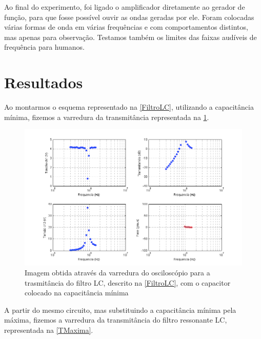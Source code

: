 \documentclass[11pt,a4paper]{article}
\begin{document}
    
    
    
    Ao final do experimento, foi ligado o amplificador diretamente ao gerador de função, para que fosse possível ouvir as ondas geradas por ele. Foram colocadas várias formas de onda em várias frequências e com comportamentos distintos, mas apenas para observação. Testamos também os limites das faixas audíveis de frequência para humanos.
    
\newpage  
\section{Resultados}

    
        
    Ao montarmos o esquema representado na \cref{FiltroLC}, utilizando a capacitância mínima, fizemos a varredura da transmitância representada na \cref{Minima}.
    
        \begin{figure}[!htb]
        \centering
        \includegraphics[scale=0.8]{TMinima.png}
        \caption{Imagem obtida através da varredura do osciloscópio para a trasmitância do filtro LC, descrito na \cref{FiltroLC}, com o capacitor colocado na capacitância mínima }
        \label{Minima}
        \end{figure}
    \newpage
    A partir do mesmo circuito, mas substituindo a capacitância mínima pela máxima, fizemos a varredura da transmitância do filtro ressonante LC, representada na \cref{TMaxima}.
    
\end{document}
